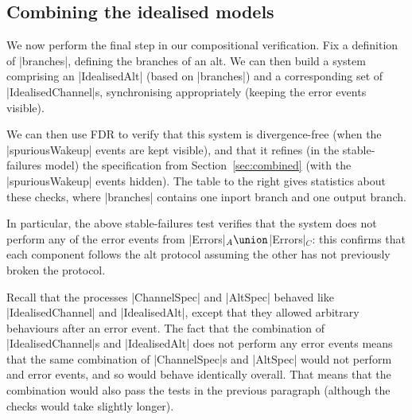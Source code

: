 \subsection{Combining the idealised models}
\label{sec:combiningIdealised}

We now perform the final step in our compositional verification. 
%
Fix a definition of |branches|, defining the branches of an
alt.  We can then build a system comprising an |IdealisedAlt| (based on
|branches|) and a corresponding set of |IdealisedChannel|s, synchronising
appropriately (keeping the error events visible).

\begin{window}
%
We can then use FDR to verify that this system is divergence-free (when the
|spuriousWakeup| events are kept visible), and that it refines (in the
stable-failures model) the specification from Section~\ref{sec:combined} (with
the |spuriousWakeup| events hidden).  The table to the right gives statistics
about these checks, where 
|branches| contains one inport branch and one output branch.
\end{window}

In particular, the above stable-failures test verifies that the system does
not perform any of the error events from |Errors|$_A \union\null$|Errors|$_C$:
this confirms that each component follows the alt protocol assuming the other
has not previously broken the protocol.

Recall that the processes |ChannelSpec| and |AltSpec| behaved like
|IdealisedChannel| and |IdealisedAlt|, except that they allowed arbitrary
behaviours after an error event.  The fact that the combination of
|IdealisedChannel|s and |IdealisedAlt| does not perform any error events means
that the same combination of |ChannelSpec|s and |AltSpec| would not perform
and error events, and so would behave identically overall.  That means that
the combination would also pass the tests in the previous paragraph (although
the checks would take slightly longer).

